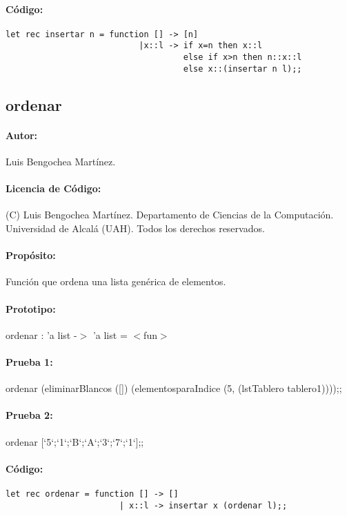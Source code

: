 \paragraph{Código:}
\begin{verbatim}
let rec insertar n = function [] -> [n]
                           |x::l -> if x=n then x::l
                                    else if x>n then n::x::l
                                    else x::(insertar n l);;
\end{verbatim}

\subsection{ordenar}

\paragraph{Autor:} Luis Bengochea Martínez.
\paragraph{Licencia de Código:} (C) Luis Bengochea Martínez. Departamento de Ciencias de la
Computación. Universidad de Alcalá (UAH). Todos los derechos reservados.
\paragraph{Propósito:} Función que ordena una lista genérica de elementos.
\paragraph{Prototipo:} ordenar : 'a list -$>$ 'a list = $<$fun$>$
\paragraph{Prueba 1:} ordenar (eliminarBlancos ([]) (elementosparaIndice (5, (lstTablero
tablero1))));; 
\paragraph{Prueba 2:} ordenar [`5`;`1`;`B`;`A`;`3`;`7`;`1`];;
\paragraph{Código:}

\begin{verbatim}
let rec ordenar = function [] -> []
                       | x::l -> insertar x (ordenar l);;
\end{verbatim}

